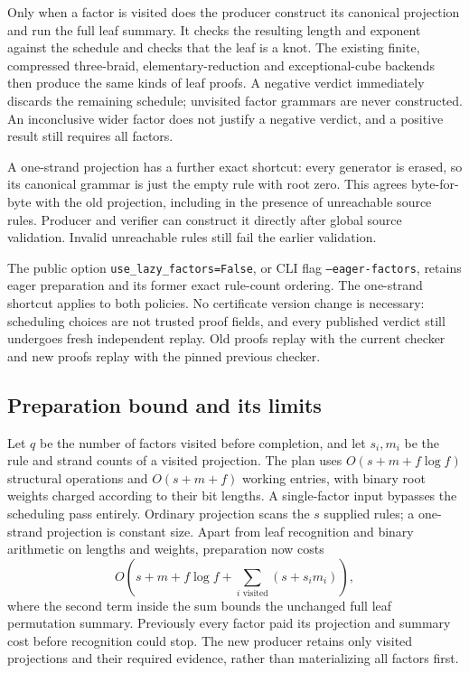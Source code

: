 Only when a factor is visited does the producer construct its canonical
projection and run the full leaf summary. It checks the resulting length
and exponent against the schedule and checks that the leaf is a knot.
The existing finite, compressed three-braid, elementary-reduction and
exceptional-cube backends then produce the same kinds of leaf proofs.
A negative verdict immediately discards the remaining schedule; unvisited
factor grammars are never constructed. An inconclusive wider factor does
not justify a negative verdict, and a positive result still requires all
factors.

A one-strand projection has a further exact shortcut: every generator is
erased, so its canonical grammar is just the empty rule with root zero.
This agrees byte-for-byte with the old projection, including in the
presence of unreachable source rules. Producer and verifier can construct
it directly after global source validation. Invalid unreachable rules
still fail the earlier validation.

The public option \texttt{use\_lazy\_factors=False}, or CLI flag
\texttt{--eager-factors}, retains eager preparation and its former exact
rule-count ordering. The one-strand shortcut applies to both policies.
No certificate version change is necessary: scheduling choices are not
trusted proof fields, and every published verdict still undergoes fresh
independent replay. Old proofs replay with the current checker and new
proofs replay with the pinned previous checker.

\subsection{Preparation bound and its limits}

Let $q$ be the number of factors visited before completion, and let $s_i,m_i$
be the rule and strand counts of a visited projection. The plan uses
$O(s+m+f\log f)$ structural operations and $O(s+m+f)$ working entries, with
binary root weights charged according to their bit lengths. A single-factor
input bypasses the scheduling pass entirely. Ordinary projection scans the
$s$ supplied rules; a one-strand projection is constant size. Apart from
leaf recognition and binary arithmetic on lengths and weights, preparation now costs
\[
 O\!\left(s+m+f\log f+\sum_{i\text{ visited}}(s+s_i m_i)\right),
\]
where the second term inside the sum bounds the unchanged full leaf
permutation summary. Previously every factor paid its projection and
summary cost before recognition could stop. The new producer retains only
visited projections and their required evidence, rather than materializing
all factors first.

